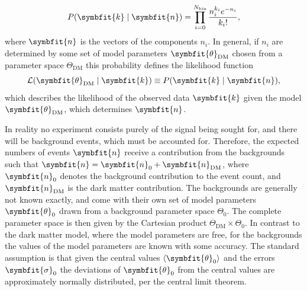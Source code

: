 \documentclass[b5paper, 10pt, twoside]{book}
\renewcommand{\vec}[1]{\symbfit{#1}}
\newcommand{\tmean}[1]{\langle#1\rangle}
\begin{document}
\begin{equation}
    P(\vec{k}\mid \vec{n})=\prod_{i=0}^{N_\text{bin}}\frac{n_i^{k_i}e^{-n_i}}{{k_i}!},
\end{equation}
where $\vec{n}$ is the vectors of the components $n_i$. In general, if $n_i$ are determined by some set of model parameters $\vec{\theta}_\text{DM}$ chosen from a parameter space $\Theta_\text{DM}$ this probability defines the likelihood function
\begin{equation}
    \mathcal{L}(\vec{\theta}_\text{DM}\mid\vec{k})\equiv P(\vec{k}\mid \vec{n}),
\end{equation}
which describes the likelihood of the observed data $\vec{k}$ given the model $\vec{\theta}_\text{DM}$, which determines $\vec{n}$.

In reality no experiment consists purely of the signal being sought for, and there will be background events, which must be accounted for. Therefore, the expected numbers of events $\vec{n}$ receive a contribution from the backgrounds such that $\vec{n}=\vec{n}_\text{0}+\vec{n}_\text{DM}$, where $\vec{n}_\text{0}$ denotes the background contribution to the event count, and $\vec{n}_\text{DM}$ is the dark matter contribution. The backgrounds are generally not known exactly, and come with their own set of model parameters $\vec{\theta}_0$ drawn from a background parameter space $\Theta_0$. The complete parameter space is then given by the Cartesian product $\Theta_\text{DM}\times\Theta_0$. In contrast to the dark matter model, where the model parameters are free, for the backgrounds the values of the model parameters are known with some accuracy. The standard assumption is that given the central values $\tmean{\vec{\theta}_0}$ and the errors $\vec{\sigma}_0$ the deviations of $\vec{\theta}_0$ from the central values are approximately normally distributed, per the central limit theorem.
\end{document}
